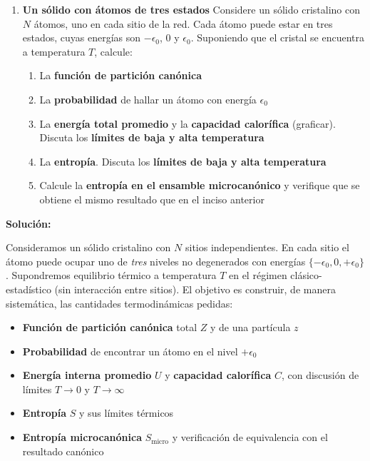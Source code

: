 \documentclass{article}
\newenvironment{AGbox}[1][7]%
{%
  \begin{tcolorbox}[
    enhanced, breakable,
    colframe=AppleGreen,
    colback=AppleGreen!#1,
    boxrule=1pt,
    borderline west={2mm}{-10mm}{AppleGreen},
    sharp corners=southwest,
    left=14pt,right=14pt,top=10pt,bottom=10pt,
     boxsep=6pt,
  ]%
}{%
  \end{tcolorbox}%
}
\begin{document}
\begin{AGbox}[8]
	\begin{enumerate}[label={{\textcolor{trueblue}{\textbf{Pr.} \arabic*.3}}}, start=1]
		\item \textbf{Un sólido con átomos de tres estados} \;
		Considere un sólido cristalino con $N$ átomos, uno en cada sitio de la red. Cada átomo puede estar en tres estados, cuyas energías son $-\epsilon_0$, $0$ y $\epsilon_0$. Suponiendo que el cristal se encuentra a temperatura $T$, calcule:
		\begin{enumerate}[label=\textbf{(\alph*)}]
			\item La \textbf{función de partición canónica}
			\item La \textbf{probabilidad} de hallar un átomo con energía $\epsilon_0$
			\item La \textbf{energía total promedio} y la \textbf{capacidad calorífica} (graficar). Discuta los \textbf{límites de baja y alta temperatura}
			\item La \textbf{entropía}. Discuta los \textbf{límites de baja y alta temperatura}
			\item Calcule la \textbf{entropía en el ensamble microcanónico} y verifique que se obtiene el mismo resultado que en el inciso anterior
		\end{enumerate}
	\end{enumerate}
\end{AGbox}

\textcolor{Cinnabar}{\textbf{Solución:}}


Consideramos un sólido cristalino con $N$ sitios independientes. En cada sitio el átomo puede ocupar uno de \textit{tres} niveles no degenerados con energías $\{-\epsilon_0,0,+\epsilon_0\}$. Supondremos equilibrio térmico a temperatura $T$ en el régimen clásico-estadístico (sin interacción entre sitios). El objetivo es construir, de manera sistemática, las cantidades termodinámicas pedidas:

\begin{itemize}
\item[$\bullet$] \textbf{Función de partición canónica} total $Z$ y de una partícula $z$
\item[$\bullet$] \textbf{Probabilidad} de encontrar un átomo en el nivel $+\epsilon_0$
\item[$\bullet$] \textbf{Energía interna promedio} $U$ y \textbf{capacidad calorífica} $C$, con discusión de límites $T\to 0$ y $T\to\infty$
\item[$\bullet$] \textbf{Entropía} $S$ y sus límites térmicos
\item[$\bullet$] \textbf{Entropía microcanónica} $S_{\text{micro}}$ y verificación de equivalencia con el resultado canónico
\end{itemize}
\end{document}
